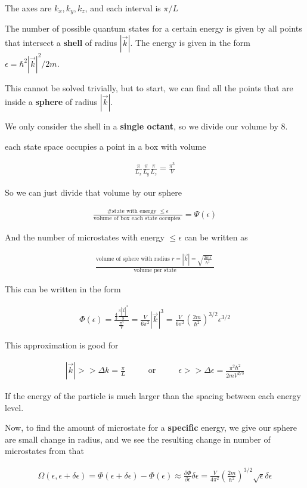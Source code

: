 \documentclass[fleqn]{report}
\newcommand{\hp}{\hspace{1cm}}
\newcommand{\del}{\partial}
\newcommand{\equations} [1] {
\begin{gather*}
#1
\end{gather*}
}
\begin{document}
The axes are $k_x, k_y, k_z$, and each interval is $\pi/L$

The number of possible quantum states for a certain energy is given 
by all points that intersect a \textbf{shell} of radius $|\vec k|$. 
The energy is given in the form $\epsilon = \hbar^2 |\vec k|^2 / 2m$.

This cannot be solved trivially, but to start, we can find all the points 
that are inside a \textbf{sphere} of radius $|\vec k|$.

We only consider the shell in a \textbf{single octant}, so we 
divide our volume by $8$.

each state space occupies a point in a box with volume
\equations{
    \frac{\pi}{L_x}
    \frac{\pi}{L_y}
    \frac{\pi}{L_z}
    =
    \frac{\pi^3}{V}
}

So we can just divide that volume by our sphere 

\equations{
    \frac{
        \textrm{\# state with energy $\leq \epsilon$}
    }
    {
        \textrm{volume of box each state occupies }
    }
    =
    \Psi(\epsilon)
}

And the number of microstates with energy $\leq \epsilon$ can be written as 
\equations{
    \frac{
        \textrm{
            volume of sphere with radius $r = |\vec k|
            = \sqrt{\frac{2m\epsilon}{\hbar^2}}$
        }
    }
    {
        \textrm{volume per state}
    }
}

This can be written in the form 
\equations{
    \Phi(\epsilon)
    =
    \frac{
        \frac{4}{3} \frac{\pi |\vec k|^3 }{8}
    }
    {
        \frac{\pi^3}{V}
    }
    =
    \frac{V}{6 \pi^2}
    |\vec k|^3
    =
    \frac{V}{6 \pi^2}
    \left(
        \frac{2m}{\hbar^2}
    \right)^{3/2}
    \epsilon^{3/2}
}

This approximation is good for 
\equations{
    |\vec k| 
    >> 
    \Delta k 
    =
    \frac{\pi}{L}
    \hp
    \textrm{ or } 
    \hp
    \epsilon >> \Delta \epsilon 
    =
    \frac{\pi^2 \hbar^2}{2m V^{2/3}}
}

If the energy of the particle is much larger than the 
spacing between each energy level. 

Now, to find the amount of microstate for a \textbf{specific} energy, 
we give our sphere are small change in radius, and we see the resulting change 
in number of microstates from that 

\equations{
    \Omega(\epsilon, \epsilon + \delta \epsilon)
    =
    \Phi(\epsilon + \delta \epsilon)
    -
    \Phi(\epsilon)
    \approx 
    \frac{\del \Phi}{\del \epsilon}
    \delta \epsilon 
    =
    \frac{V}{4 \pi^2}
    \left(
        \frac{2m}{\hbar^2}
    \right)^{3/2}
    \sqrt{\epsilon}
    \delta \epsilon
}
\end{document}
